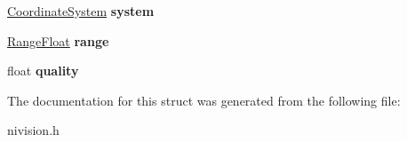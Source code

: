 \begin{DoxyCompactItemize}
\item 
\hypertarget{structCalibrationInfo__struct_a4eecaa8a65776d8bf955f557a09d555b}{
\hyperlink{structCoordinateSystem__struct}{CoordinateSystem} {\bfseries system}}
\label{structCalibrationInfo__struct_a4eecaa8a65776d8bf955f557a09d555b}

\item 
\hypertarget{structCalibrationInfo__struct_a111b3ba819c6af37f393334300bf3e8f}{
\hyperlink{structRangeFloat__struct}{RangeFloat} {\bfseries range}}
\label{structCalibrationInfo__struct_a111b3ba819c6af37f393334300bf3e8f}

\item 
\hypertarget{structCalibrationInfo__struct_a070499ef1cb26f1f6683b155d6ba46e8}{
float {\bfseries quality}}
\label{structCalibrationInfo__struct_a070499ef1cb26f1f6683b155d6ba46e8}

\end{DoxyCompactItemize}


The documentation for this struct was generated from the following file:\begin{DoxyCompactItemize}
\item 
nivision.h\end{DoxyCompactItemize}
